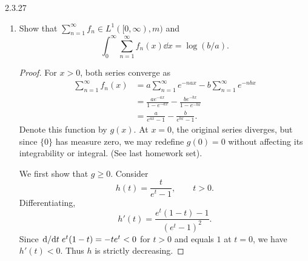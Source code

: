 \documentclass[11pt]{article}
\begin{document}
\begin{problem}{2.3.27}
\begin{enumerate}[label=(\alph*)]
\begin{proof}
        We obtain
        \begin{equation}
          \label{eq:p2327-integral}
          \begin{aligned}
            \int_0^\infty f_n(x)\dd{x}
            &= \lim_{R\to\infty}
               \int_0^R \left(ae^{-nax}-be^{-nbx}\right)\dd{x} \\
            &= \lim_{R\to\infty}
               \left[-\frac{e^{-nax}}{n}
               +\frac{e^{-nbx}}{n}\right]_0^R \\
            &= \frac{1}{n}-\frac{1}{n} \\
            &= 0.
          \end{aligned}
        \end{equation}
        Consequently,
        \begin{equation}
          \label{eq:p2327-zero}
          \sum_{n=1}^\infty\int_0^\infty f_n(x)\dd{x}
          = \sum_{n=1}^\infty 0 = 0.
        \end{equation}
      \end{proof}

    \item Show that \( \sum_{n=1}^\infty f_n \in L^1([0,\infty),m) \)
      and
      \begin{equation}
        \label{eq:p2327-c}
        \int_0^\infty \sum_{n=1}^\infty f_n(x)\dd{x}
        = \log(b/a).
      \end{equation}
      \begin{proof}
        For \( x > 0 \), both series converge as
        \begin{equation}
          \label{eq:p2327-geometric}
          \begin{aligned}
            \sum_{n=1}^\infty f_n(x)
            &= a\sum_{n=1}^\infty e^{-nax}
               -b\sum_{n=1}^\infty e^{-nbx} \\
            &= \frac{ae^{-ax}}{1-e^{-ax}}
               -\frac{be^{-bx}}{1-e^{-bx}} \\
            &= \frac{a}{e^{ax}-1}
               -\frac{b}{e^{bx}-1}.
          \end{aligned}
        \end{equation}
        Denote this function by \( g(x) \).
        At \( x=0 \), the original series diverges, but since
        \( \{0\} \) has measure zero, we may redefine \( g(0)=0 \)
        without affecting its integrability or integral. (See last homework set).

        We first show that \( g \geq 0 \).
        Consider
        \begin{equation}
          \label{eq:p2327-h}
          h(t)=\frac{t}{e^t-1}, \qquad t>0.
        \end{equation}
        Differentiating,
        \begin{equation}
          \label{eq:p2327-h-derivative}
          h'(t)=\frac{e^t(1-t)-1}{(e^t-1)^2}.
        \end{equation}
        Since \(\dv*{t} e^t(1-t) = -te^t<0 \) for \( t>0 \) and equals \( 1 \) at \( t=0 \),
        we have \( h'(t)<0 \).
        Thus \( h \) is strictly decreasing.


\end{proof}
\end{enumerate}
\end{problem}
\end{document}
